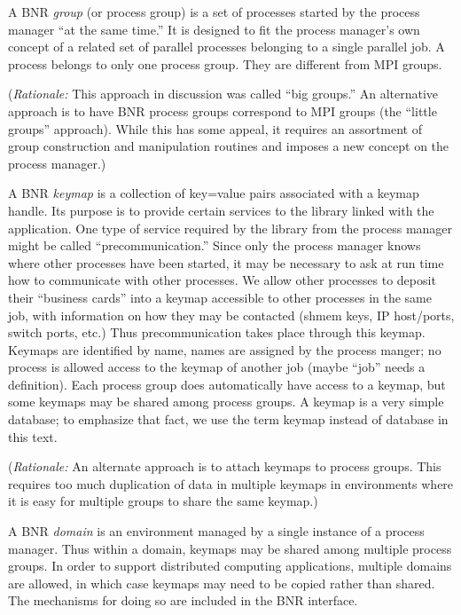 \documentclass{article}
\begin{document}
A BNR {\em group\/} (or process group) is a set of processes started by the
process manager ``at the same time.''  It is designed to fit the process
manager's own concept of a related set of parallel processes belonging to a
single parallel job.  A process belongs to only one process group.  They are 
different from MPI groups.

({\em Rationale:\/}  This approach in discussion was called ``big groups.''
An alternative approach is to have BNR process groups correspond to MPI groups
(the ``little groups'' approach).  While this has some appeal, it requires an
assortment of group construction and manipulation routines and imposes a new
concept on the process manager.)

A BNR {\em keymap\/} is a collection of key=value pairs associated
with a keymap handle.  Its purpose is to provide certain
services to the library linked with the application.  One type of
service required by the library from the process manager might be
called ``precommunication.''  Since only the process manager knows
where other processes have been started, it may be necessary to ask at
run time how to communicate with other processes.  We allow other
processes to deposit their ``business cards'' into a keymap accessible
to other processes in the same job, with information on how they may
be contacted (shmem keys, IP host/ports, switch ports, etc.)  Thus
precommunication takes place through this keymap.  Keymaps are
identified by name, names are assigned by the process manger; no
process is allowed access to the keymap of another job (maybe ``job''
needs a definition).  Each process group does automatically have
access to a keymap, but some keymaps may be shared among process
groups.  A keymap is a very simple database; to emphasize that fact,
we use the term keymap instead of database in this text.

({\em Rationale:\/}  An alternate approach is to attach keymaps to process
groups.  This requires too much duplication of data in multiple keymaps in
environments where it is easy for multiple groups to share the same keymap.)

A BNR {\em domain\/} is an environment managed by a single instance of a
process manager.  Thus within a domain, keymaps may be shared among multiple
process groups.  In order to support distributed computing applications,
multiple domains are allowed, in which case keymaps may need to be copied
rather than shared.  The mechanisms for doing so are included in the BNR
interface. 
\end{document}
